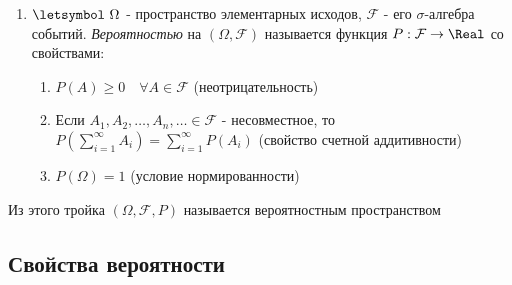 \documentclass[12pt]{article}
\begin{document}
\begin{enumerate}
\begin{enumerate}
            \begin{tcolorbox}
                $\Box \quad$ $A, B \in \mathcal{F} \Longrightarrow A, \overline{B} \in \mathcal{F} \Longrightarrow A \setminus B = A \cdot \overline{B} \in \mathcal{F}$ $\quad \Box$
            \end{tcolorbox}

        \end{enumerate}

         $\mathcal{F} = \{\emptyset, \Omega\}$

         $\mathcal{F} = \{\emptyset, \Omega, A, \overline{A}\}$

         \Defs Борелевская $\sigma$-алгебра $\mathcal{B}(\Real)$ - минимальная $\sigma$-алгебра, содержащая все возможные интервалы на прямой


        \item \Defs $\letsymbol\ \Omega$ - пространство элементарных исходов, $\mathcal{F}$ - его $\sigma$-алгебра событий.
        \textit{Вероятностью} на $(\Omega, \mathcal{F})$ называется функция $P: \mathcal{F} \to \Real$ со свойствами:

        \begin{enumerate}
            \item $P(A) \geq 0 \quad \forall A \in \mathcal{F}$ (неотрицательность)

            \item Если $A_1, A_2, \dots, A_n, \dots \in \mathcal{F}$ - несовместное, то $P(\sum_{i = 1}^\infty A_i) = \sum_{i = 1}^\infty P(A_i)$ (свойство счетной аддитивности)

            \item $P(\Omega) = 1$ (условие нормированности)
        \end{enumerate}

    \end{enumerate}

    \hypertarget{probabilityspace}{}

    \Def Из этого тройка $(\Omega, \mathcal{F}, P)$ называется вероятностным пространством

    \subsection{Свойства вероятности}

    \hypertarget{probabilityproperties}{}
\end{document}
